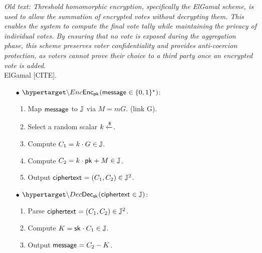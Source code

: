 \textit{Old text: Threshold homomorphic encryption, specifically the ElGamal scheme, is used to allow the summation of encrypted votes without decrypting them. This enables the system to compute the final vote tally while maintaining the privacy of individual votes. By ensuring that no vote is exposed during the aggregation phase, this scheme preserves voter confidentiality and provides anti-coercion protection, as voters cannot prove their choice to a third party once an encrypted vote is added.}\\

ElGamal [CITE].

\medskip

\begin{mdframed}
	\begin{minipage}[t]{0.54\textwidth}
		\begin{itemize}
			\item[$\bullet$] $\hlset{\Enc}_{\pk}(\msg \in \{0,1\}^\star)$:  \vspace{0.1cm}
			\begin{enumerate}
				\item Map ${\sf{message}^{}}$ to $\mathbb{J}$ via $M = mG$. (link G).
				\item Select a random scalar $k \xleftarrow{\$} $.
				\item Compute $C_1 = k \cdot G \in \mathbb{J}$.
				\item Compute $C_2 = k \cdot {\sf{pk}^{}} + M \in \mathbb{J}$. 
				\item Output ${\sf{ciphertext}^{}} = (C_1, C_2) \in \mathbb{J}^2$.
			\end{enumerate}
		\end{itemize}
	\end{minipage}
	\begin{minipage}[t]{0.44\textwidth}
		\begin{itemize}
			\item[$\bullet$] $\hlset{\Dec}_{\sk}(\enc \in \J)$: \vspace{0.1cm}
			\begin{enumerate}

				
				\item Parse ${\sf{ciphertext}^{}} = (C_1, C_2) \in \mathbb{J}^2$.
				\item Compute $K = {\sf{sk}^{}} \cdot C_1 \in \mathbb{J}$.
				\item Output ${\sf{message}^{}} = C_2 - K$. 
			\end{enumerate}
		\end{itemize}
	\end{minipage}
\end{mdframed}

